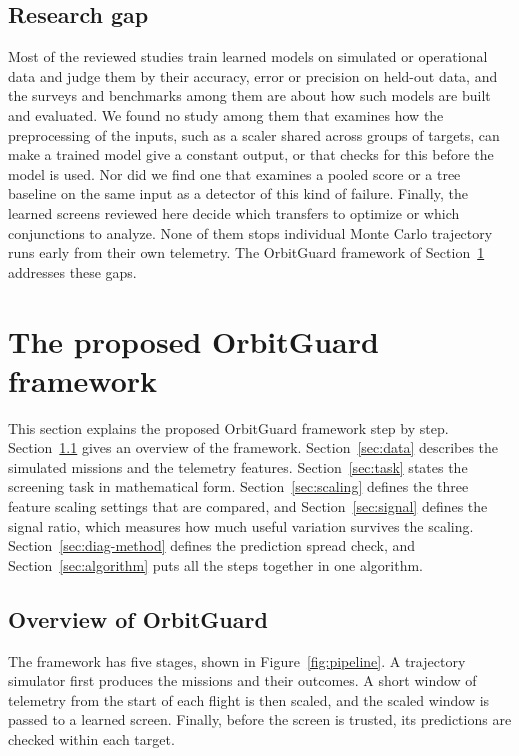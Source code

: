 \subsection{Research gap}
\label{sec:gap}

Most of the reviewed studies train learned models on simulated or operational data and judge them by their accuracy, error or precision on held-out data, and the surveys and benchmarks among them are about how such models are built and evaluated. We found no study among them that examines how the preprocessing of the inputs, such as a scaler shared across groups of targets, can make a trained model give a constant output, or that checks for this before the model is used. Nor did we find one that examines a pooled score or a tree baseline on the same input as a detector of this kind of failure. Finally, the learned screens reviewed here decide which transfers to optimize or which conjunctions to analyze. None of them stops individual Monte Carlo trajectory runs early from their own telemetry. The OrbitGuard framework of Section~\ref{sec:method} addresses these gaps.

\section{The proposed OrbitGuard framework}
\label{sec:method}

This section explains the proposed OrbitGuard framework step by step. Section~\ref{sec:overview} gives an overview of the framework. Section~\ref{sec:data} describes the simulated missions and the telemetry features. Section~\ref{sec:task} states the screening task in mathematical form. Section~\ref{sec:scaling} defines the three feature scaling settings that are compared, and Section~\ref{sec:signal} defines the signal ratio, which measures how much useful variation survives the scaling. Section~\ref{sec:diag-method} defines the prediction spread check, and Section~\ref{sec:algorithm} puts all the steps together in one algorithm.

\subsection{Overview of OrbitGuard}
\label{sec:overview}

The framework has five stages, shown in Figure~\ref{fig:pipeline}. A trajectory simulator first produces the missions and their outcomes. A short window of telemetry from the start of each flight is then scaled, and the scaled window is passed to a learned screen. Finally, before the screen is trusted, its predictions are checked within each target.


